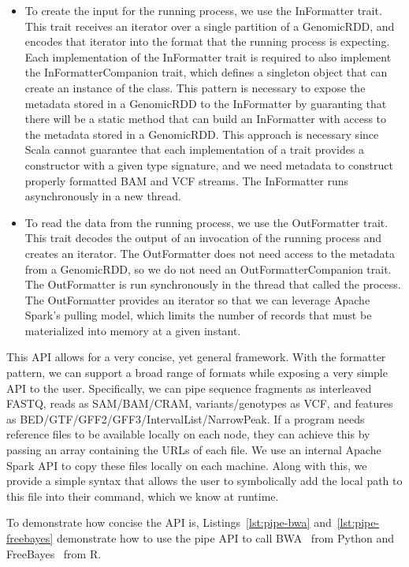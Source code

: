 \documentclass[phd]{ucbthesis}
\begin{document}
\begin{itemize}
\item To create the input for the running process, we use the
  {InFormatter} trait. This trait receives an iterator over a single
  partition of a {GenomicRDD}, and encodes that iterator into the format
  that the running process is expecting. Each implementation of the
  {InFormatter} trait is required to also implement the
  {InFormatterCompanion} trait, which defines a singleton object that
  can create an instance of the class. This pattern is necessary to expose
  the metadata stored in a {GenomicRDD} to the {InFormatter} by
  guaranting that there will be a static method that can build an
  {InFormatter} with access to the metadata stored in a
  {GenomicRDD}. This approach is necessary since {Scala} cannot
  guarantee that each implementation of a trait provides a constructor with a
  given type signature, and we need metadata to construct properly formatted
  BAM and VCF streams. The {InFormatter} runs asynchronously in a new
  thread.
\item To read the data from the running process, we use the
  {OutFormatter} trait. This trait decodes the output of an invocation of
  the running process and creates an iterator. The {OutFormatter} does
  not need access to the metadata from a {GenomicRDD}, so we do not need
  an {OutFormatterCompanion} trait. The {OutFormatter} is run
  synchronously in the thread that called the process. The {OutFormatter}
  provides an iterator so that we can leverage {Apache Spark}'s pulling
  model, which limits the number of records that must be materialized into
  memory at a given instant.
\end{itemize}

This API allows for a very concise, yet general framework. With the
formatter pattern, we can support a broad range of formats while exposing a
very simple API to the user. Specifically, we can pipe sequence fragments as
interleaved FASTQ, reads as SAM/BAM/CRAM, variants/genotypes as VCF, and
features as BED/GTF/GFF2/GFF3/Interval\-List/Narrow\-Peak. If
a program needs reference files to be available locally on each node, they can
achieve this by passing an array containing the URLs of each file. We use an
internal {Apache Spark} API to copy these files locally on each machine.
Along with this, we provide a simple syntax that allows the user to symbolically
add the local path to this file into their command, which we know at runtime.

To demonstrate how concise the API is, Listings~\ref{lst:pipe-bwa}
and~\ref{lst:pipe-freebayes} demonstrate how to use the {pipe}
API to call BWA~\cite{li09bwa} from {Python} and
{FreeBayes}~\cite{garrison12} from R.
\end{document}
